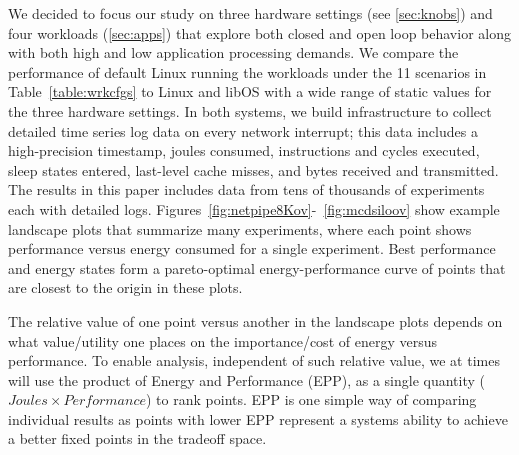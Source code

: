 We decided to focus our study on three hardware settings (see \cref{sec:knobs}) and four workloads (\cref{sec:apps}) that explore both closed and open loop behavior along with both high and low application processing demands.  
We compare the performance of default Linux running the workloads under the 11 scenarios in Table~\ref{table:wrkcfgs} to  Linux and libOS with a wide range of static values for the three hardware settings.  
In both systems, we build infrastructure to collect detailed time series log data on every network interrupt; this data includes a high-precision timestamp, joules consumed, instructions and cycles executed, sleep states entered, last-level cache misses, and bytes received and transmitted.
The results in this paper includes data from tens of thousands of experiments each with detailed logs.
Figures~\ref{fig:netpipe8Kov}-~\ref{fig:mcdsiloov} show example landscape plots that summarize many experiments, where each point shows performance versus energy consumed for a single experiment.  
Best performance and energy states form a pareto-optimal energy-performance curve of points that are closest to the origin in these plots.  

The relative value of one point versus another in the landscape plots depends on what value/utility one places on the importance/cost of energy versus performance.  To enable analysis,  independent of such relative value, we at times will use the product of  Energy and Performance  (EPP), as a single quantity ($Joules \times Performance$) to rank points.  
EPP is one simple way of comparing individual results as points with lower EPP represent a systems ability to achieve a better fixed points in the tradeoff space.   

